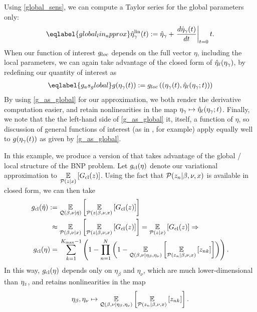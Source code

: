 Using \eqref{global_sens}, we can compute a Taylor series for the
global parameters only:
%
\begin{align}\eqlabel{global_lin_approx}
  \etalin_\gamma(\t) := \etaopt_\gamma +
  \fracat{d \etaopt_\gamma(\t)}{d \t}{\t=0} \t .
\end{align}
%
When our function of interest $g_{loc}$ depends on the full vector $\eta$,
including the local parameters, we can again take advantage of the closed form
of $\hat\eta_{\ell}(\eta_{\gamma})$, by redefining our quantity of interest as
%
\begin{align}\eqlabel{g_as_global}
\g(\etaglob(\t)) :=
    \g_{loc}\left(
        \left(\etaglob(\t), \etaoptlocal(\etaglob; \t) \right) \right)
\end{align}
%
By using \eqref{g_as_global} for our approximation, we both render the
derivative computation easier, and retain nonlinearities in the map $\eta_{\gamma}
\mapsto \hat\eta_{\ell}(\eta_{\gamma}; t)$.  Finally, we note that the the left-hand
side of \eqref{g_as_global} it, itself, a function of $\eta$, so discussion of
general functions of interest (as in , for example) apply equally well to $g(\eta_{\gamma}(t))$
as given by \eqref{g_as_global}.


\begin{ex}
%
In this example, we produce a version of 
that takes advantage of the global / local structure of the BNP problem. Let
$g_{\text{cl}}(\eta)$ denote our variational approximation to
$\underset{\mathcal{P}(z\vert x)}{\mathbb{E}}\left[G_{\text{cl}}(z)\right]$.   Using the fact that $\mathcal{P}(z_n
\vert \beta, \nu, x)$ is available in closed form, we can then take
%
\begin{align*}
%
\gclustersabbr(\etaopt) :={}&
    \expect{\q(\beta, \nu \vert\etaopt)}{
        \expect{\p(\z \vert \beta, \nu, \x)}{\nclusters(\z)}
    }
\\\approx{}&
    \expect{\p(\beta, \nu \vert \x)}{
        \expect{\p(\z \vert \beta, \nu, \x)}{\nclusters(\z)}
    }
    = \expect{\p(\z\vert\x)}{\nclusters(\z)} \Rightarrow \\
%
\gclustersabbr(\eta) ={}&
    \sumkm \left(1 -  \prod_{\n=1}^\N
        \left(1 - \expect{\q(\beta, \nu \vert \eta_\beta, \eta_\nu)}
                    {\expect{\p(\z_{\n} \vert \beta, \nu, \x)}{\z_{\n\k}}}
                    \right)\right).
%
\end{align*}
%
In this way, $g_{\text{cl}}(\eta)$ depends only on $\eta_\beta$ and $\eta_\nu$,
which are much lower-dimensional than $\eta_z$, and retains nonlinearities in
the map
%
\begin{align*}
%
\eta_\beta, \eta_\nu \mapsto \expect{\q(\beta, \nu \vert \eta_\beta,
\eta_\nu)} {\expect{\p(\z_{\n} \vert \beta, \nu, \x)}{\z_{\n\k}}}.
%
\end{align*}
%
\end{ex}

